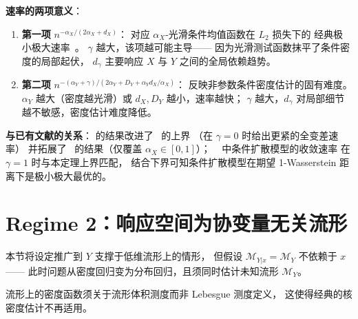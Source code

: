 \textbf{速率的两项意义}：
\begin{enumerate}
    \item \textbf{第一项} $n^{-\alpha_X/(2\alpha_X+d_X)}$：
          对应 $\alpha_X$-光滑条件均值函数在 $L_2$ 损失下的
          经典极小极大速率~\citep{Stone1982}。
          $\gamma$ 越大，该项越可能主导——
          因为光滑测试函数抹平了条件密度的局部起伏，
          $d_\gamma$ 主要响应 $X$ 与 $Y$ 之间的全局依赖趋势。
    \item \textbf{第二项} $n^{-(\alpha_Y+\gamma)/(2\alpha_Y+D_Y+\alpha_Y d_X/\alpha_X)}$：
          反映非参数条件密度估计的固有难度。
          $\alpha_Y$ 越大（密度越光滑）或 $d_X, D_Y$ 越小，速率越快；
          $\gamma$ 越大，$d_\gamma$ 对局部细节越不敏感，密度估计难度降低。
\end{enumerate}

\textbf{与已有文献的关系}：
\citep{tang2025regression} 的结果改进了~\citep{Bilodeau2023} 的上界
（在 $\gamma=0$ 时给出更紧的全变差速率）
并拓展了~\citep{Li2022} 的结果（仅覆盖 $\alpha_X \in [0,1]$）；
~\citep{tang2024diffusion} 中条件扩散模型的收敛速率
在 $\gamma=1$ 时与本定理上界匹配，
结合下界可知条件扩散模型在期望 1-Wasserstein 距离下是极小极大最优的。

\section{Regime 2：响应空间为协变量无关流形}\label{sec:ch2-regime2}

本节将设定推广到 $Y$ 支撑于低维流形上的情形，
但假设 $\mathcal{M}_{Y|x} = \mathcal{M}_Y$ 不依赖于 $x$——
此时问题从密度回归变为分布回归，且须同时估计未知流形 $\mathcal{M}_Y$。

流形上的密度函数须关于流形体积测度而非 Lebesgue 测度定义，
这使得经典的核密度估计不再适用。

